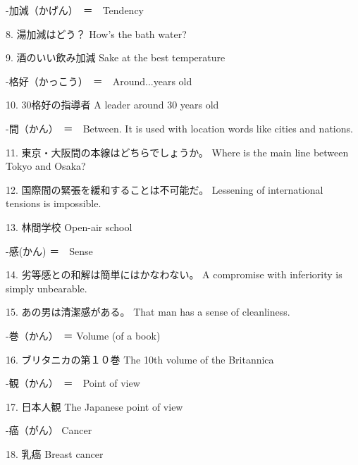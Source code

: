 \par{-加減（かげん）　＝　Tendency }

\par{8. 湯加減はどう？ \hfill\break
How's the bath water? }

\par{9. 酒のいい飲み加減 \hfill\break
Sake at the best temperature }

\par{-格好（かっこう）　＝　Around\dothyp{}\dothyp{}\dothyp{}years old }

\par{10. 30格好の指導者 \hfill\break
A leader around 30 years old }

\par{-間（かん）　＝　Between. It is used with location words like cities and nations. }

\par{11. 東京・大阪間の本線はどちらでしょうか。 \hfill\break
Where is the main line between Tokyo and Osaka? }

\par{12. 国際間の緊張を緩和することは不可能だ。 \hfill\break
Lessening of international tensions is impossible. }

\par{13. 林間学校 \hfill\break
Open-air school }

\par{-感(かん) ＝　Sense }

\par{14. 劣等感との和解は簡単にはかなわない。 \hfill\break
A compromise with inferiority is simply unbearable. }

\par{15. あの男は清潔感がある。 \hfill\break
That man has a sense of cleanliness. }

\par{-巻（かん）　＝ Volume (of a book) }

\par{16. ブリタニカの第１０巻 \hfill\break
The 10th volume of the Britannica }

\par{-観（かん）　＝　Point of view }

\par{17. 日本人観 \hfill\break
The Japanese point of view }

\par{-癌（がん） Cancer }

\par{18. 乳癌 \hfill\break
Breast cancer }

